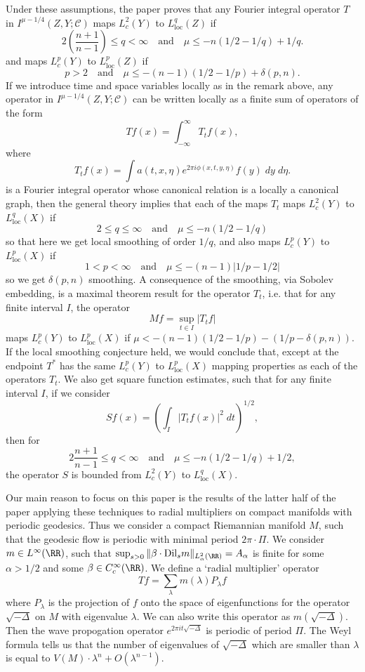 Under these assumptions, the paper proves that any Fourier integral operator $T$ in $I^{\mu - 1/4}(Z,Y;\mathcal{C})$ maps $L^2_c(Y)$ to $L^q_{\text{loc}}(Z)$ if
%
\[ 2 \left( \frac{n+1}{n-1} \right) \leq q < \infty \quad\text{and}\quad \mu \leq - n (1/2 - 1/q) + 1/q. \]
%
and maps $L^p_c(Y)$ to $L^p_{\text{loc}}(Z)$ if
%
\[ p > 2 \quad\text{and}\quad \mu \leq -(n-1)(1/2 - 1/p) + \delta(p,n). \]
%
If we introduce time and space variables locally as in the remark above, any operator in $I^{\mu - 1/4}(Z,Y;\mathcal{C})$ can be written locally as a finite sum of operators of the form
%
\[ Tf(x) = \int_{-\infty}^\infty T_t f(x), \]
%
where
%
\[ T_t f(x) = \int a(t,x,\eta) e^{2 \pi i \phi(x,t,y,\eta)} f(y)\; dy\; d\eta. \]
%
is a Fourier integral operator whose canonical relation is a locally a canonical graph, then the general theory implies that each of the maps $T_t$ maps $L^2_c(Y)$ to $L^q_{\text{loc}}(X)$ if
%
\[ 2 \leq q \leq \infty \quad\text{and}\quad \mu \leq -n(1/2 - 1/q) \]
%
so that here we get local smoothing of order $1/q$, and also maps $L^p_c(Y)$ to $L^p_{\text{loc}}(X)$ if
%
\[ 1 < p < \infty \quad\text{and}\quad \mu \leq -(n-1)|1/p - 1/2| \]
%
so we get $\delta(p,n)$ smoothing. A consequence of the smoothing, via Sobolev embedding, is a maximal theorem result for the operator $T_t$, i.e. that for any finite interval $I$, the operator
%
\[ Mf = \sup_{t \in I} |T_t f| \]
%
maps $L^p_c(Y)$ to $L^p_{\text{loc}}(X)$ if $\mu < -(n-1)(1/2 - 1/p) - (1/p - \delta(p,n))$. If the local smoothing conjecture held, we would conclude that, except at the endpoint $T^*$ has the same $L^p_c(Y)$ to $L^p_{\text{loc}}(X)$ mapping properties as each of the operators $T_t$. We also get square function estimates, such that for any finite interval $I$, if we consider
%
\[ Sf(x) = \left( \int_I |T_t f(x)|^2\; dt \right)^{1/2}, \]
%
then for
%
\[ 2 \frac{n+1}{n-1} \leq q < \infty \quad\text{and}\quad \mu \leq -n(1/2 - 1/q) + 1/2, \]
%
the operator $S$ is bounded from $L^2_c(Y)$ to $L^q_{\text{loc}}(X)$.

Our main reason to focus on this paper is the results of the latter half of the paper applying these techniques to radial multipliers on compact manifolds with periodic geodesics. Thus we consider a compact Riemannian manifold $M$, such that the geodesic flow is periodic with minimal period $2 \pi \cdot \Pi$. We consider $m \in L^\infty(\RR)$, such that $\sup_{s > 0} \| \beta \cdot \text{Dil}_s m \|_{L^2_\alpha(\RR)} = A_\alpha$ is finite for some $\alpha > 1/2$ and some $\beta \in C_c^\infty(\RR)$. We define a `radial multiplier' operator
%
\[ Tf = \sum_\lambda m(\lambda) P_\lambda f \]
%
where $P_\lambda$ is the projection of $f$ onto the space of eigenfunctions for the operator $\sqrt{-\Delta}$ on $M$ with eigenvalue $\lambda$. We can also write this operator as $m(\sqrt{-\Delta})$. Then the wave propogation operator $e^{2 \pi i t \sqrt{-\Delta}}$ is periodic of period $\Pi$. The Weyl formula tells us that the number of eigenvalues of $\sqrt{-\Delta}$ which are smaller than $\lambda$ is equal to $V(M) \cdot \lambda^n + O(\lambda^{n-1})$.

